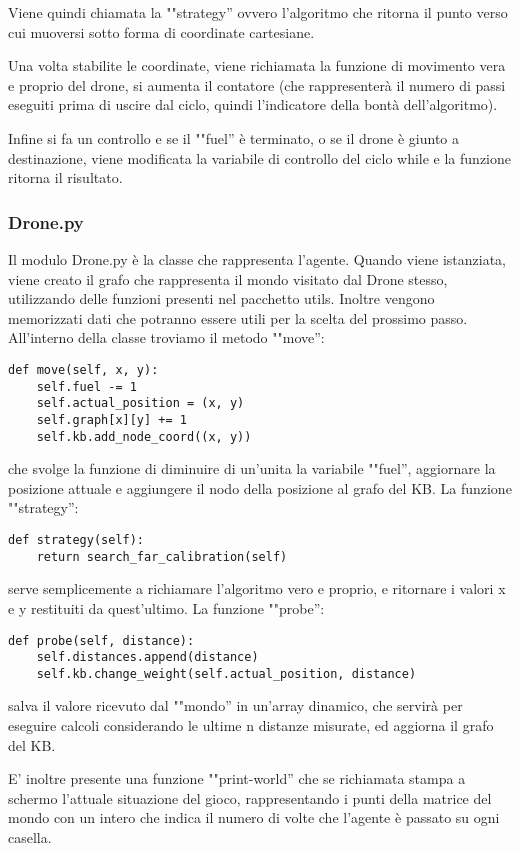 Viene quindi chiamata la ""strategy'' ovvero l'algoritmo che ritorna il punto verso cui muoversi sotto forma di coordinate cartesiane. 

Una volta stabilite le coordinate, viene richiamata la funzione di movimento vera e proprio del drone, si aumenta il contatore (che rappresenterà il numero di passi eseguiti prima di uscire dal ciclo, quindi l'indicatore della bontà dell'algoritmo). 

Infine si fa un controllo e se il ""fuel'' è terminato, o se il drone è giunto a destinazione, viene modificata la variabile di controllo del ciclo while e la funzione ritorna il risultato.

\subsubsection{Drone.py}
Il modulo Drone.py è la classe che rappresenta l'agente. Quando viene istanziata, viene creato il grafo che rappresenta il mondo visitato dal Drone stesso, utilizzando delle funzioni presenti nel pacchetto utils. Inoltre vengono memorizzati dati che potranno essere utili per la scelta del prossimo passo. 
All'interno della classe troviamo il metodo ""move'':
\begin{verbatim}
def move(self, x, y):
    self.fuel -= 1
    self.actual_position = (x, y)
    self.graph[x][y] += 1
    self.kb.add_node_coord((x, y))
\end{verbatim}
che svolge la funzione di diminuire di un'unita la variabile ""fuel'', aggiornare la posizione attuale e aggiungere il nodo della posizione al grafo del KB. 
La funzione ""strategy'':
\begin{verbatim}
def strategy(self):
    return search_far_calibration(self)
\end{verbatim}
serve semplicemente a richiamare l'algoritmo vero e proprio, e ritornare i valori x e y restituiti da quest'ultimo. 
La funzione ""probe'':
\begin{verbatim}
def probe(self, distance):
    self.distances.append(distance)
    self.kb.change_weight(self.actual_position, distance)
\end{verbatim}
salva il valore ricevuto dal ""mondo'' in un'array dinamico, che servirà per eseguire calcoli considerando le ultime n distanze misurate, ed aggiorna il grafo del KB. 

E' inoltre presente una funzione ""print-world'' che se richiamata stampa a schermo l'attuale situazione del gioco, rappresentando i punti della matrice del mondo con un intero che indica il numero di volte che l'agente è passato su ogni casella.

